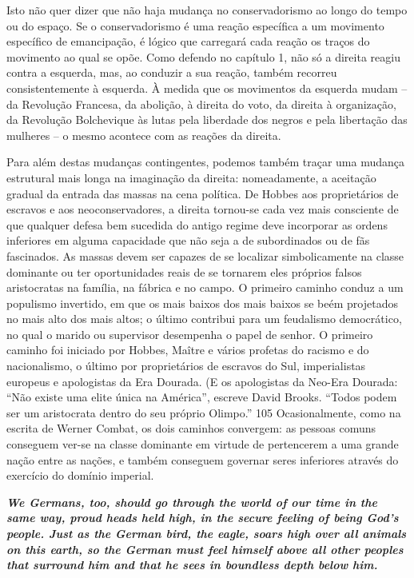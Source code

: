 \par
 
Isto não quer dizer que não haja mudança no conservadorismo ao longo do tempo ou do espaço. Se o conservadorismo é uma reação específica a um movimento específico de emancipação, é lógico que carregará cada reação os traços do movimento ao qual se opõe. Como defendo no capítulo 1, não só a direita reagiu contra a esquerda, mas, ao conduzir a sua reação, também recorreu consistentemente à esquerda. À medida que os movimentos da esquerda mudam – da Revolução Francesa, da abolição, à direita do voto, da direita à organização, da Revolução Bolchevique às lutas pela liberdade dos negros e pela libertação das mulheres – o mesmo acontece com as reações da direita.
 
\par
 
Para além destas mudanças contingentes, podemos também traçar uma mudança estrutural mais longa na imaginação da direita: nomeadamente, a aceitação gradual da entrada das massas na cena política. De Hobbes aos proprietários de escravos e aos neoconservadores, a direita tornou-se cada vez mais consciente de que qualquer defesa bem sucedida do antigo regime deve incorporar as ordens inferiores em alguma capacidade que não seja a de subordinados ou de fãs fascinados. As massas devem ser capazes de se localizar simbolicamente na classe dominante ou ter oportunidades reais de se tornarem eles próprios falsos aristocratas na família, na fábrica e no campo. O primeiro caminho conduz a um populismo invertido, em que os mais baixos dos mais baixos se beém projetados no mais alto dos mais altos; o último contribui para um feudalismo democrático, no qual o marido ou supervisor desempenha o papel de senhor. O primeiro caminho foi iniciado por Hobbes, Maître e vários profetas do racismo e do nacionalismo, o último por proprietários de escravos do Sul, imperialistas europeus e apologistas da Era Dourada. (E os apologistas da Neo-Era Dourada: “Não existe uma elite única na América”, escreve David Brooks. “Todos podem ser um aristocrata dentro do seu próprio Olimpo.”
 {\color{blue} 105}  
 Ocasionalmente, como na escrita de Werner Combat, os dois caminhos convergem: as pessoas comuns conseguem ver-se na classe dominante em virtude de pertencerem a uma grande nação entre as nações, e também conseguem governar seres inferiores através do exercício do domínio imperial.
 
\par
 

 \textbf{\textit{We Germans, too, should go through the world of our time in the same way, proud heads held high, in the secure feeling of being God’s people. Just as the German bird, the eagle, soars high over all animals on this earth, so the German must feel himself above all other peoples that surround him and that he sees in boundless depth below him.} }  
 
